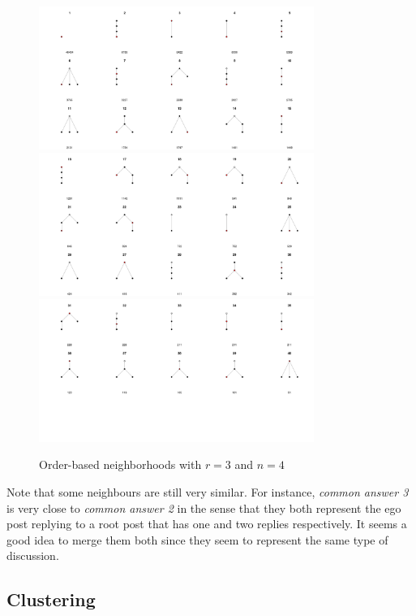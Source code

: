 \documentclass[9pt,technote]{IEEEtran}
\begin{document}
\begin{figure}
	\centering
	\includegraphics[width=0.8\textwidth]{neighbourhoods_3_4_1}
	\includegraphics[width=0.8\textwidth]{neighbourhoods_3_4_2}
	\includegraphics[width=0.8\textwidth]{neighbourhoods_3_4_3}
	\caption{Order-based neighborhoods with $r=3$ and $n=4$}
	\label{fig:neighborhoods_4_4}
\end{figure}


Note that some neighbours are still very similar. For instance, \textit{common answer 3} is very close to \textit{common answer 2} in the sense that they both represent the ego post replying to a root post that has one and two replies respectively. It seems a good idea to merge them both since they seem to represent the same type of discussion.

\subsection{Clustering}
\end{document}
